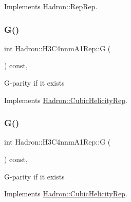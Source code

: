 Implements \mbox{\hyperlink{structHadron_1_1RepRep_a92c8802e5ed7afd7da43ccfd5b7cd92b}{Hadron\+::\+Rep\+Rep}}.

\mbox{\label{structHadron_1_1H3C4nnmA1Rep_a425b1fd7918738b76eacdc41283d587f}} 
\subsubsection{\texorpdfstring{G()}{G()}\hspace{0.1cm}{\footnotesize\ttfamily [1/3]}}
{\footnotesize\ttfamily int Hadron\+::\+H3\+C4nnm\+A1\+Rep\+::G (\begin{DoxyParamCaption}{ }\end{DoxyParamCaption}) const\hspace{0.3cm}{\ttfamily [inline]}, {\ttfamily [virtual]}}

G-\/parity if it exists 

Implements \mbox{\hyperlink{structHadron_1_1CubicHelicityRep_a50689f42be1e6170aa8cf6ad0597018b}{Hadron\+::\+Cubic\+Helicity\+Rep}}.

\mbox{\label{structHadron_1_1H3C4nnmA1Rep_a425b1fd7918738b76eacdc41283d587f}} 
\subsubsection{\texorpdfstring{G()}{G()}\hspace{0.1cm}{\footnotesize\ttfamily [2/3]}}
{\footnotesize\ttfamily int Hadron\+::\+H3\+C4nnm\+A1\+Rep\+::G (\begin{DoxyParamCaption}{ }\end{DoxyParamCaption}) const\hspace{0.3cm}{\ttfamily [inline]}, {\ttfamily [virtual]}}

G-\/parity if it exists 

Implements \mbox{\hyperlink{structHadron_1_1CubicHelicityRep_a50689f42be1e6170aa8cf6ad0597018b}{Hadron\+::\+Cubic\+Helicity\+Rep}}.

\mbox{\label{structHadron_1_1H3C4nnmA1Rep_a425b1fd7918738b76eacdc41283d587f}} 
